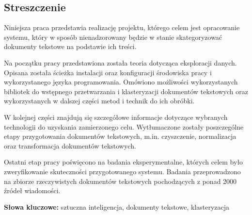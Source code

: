 \subsection*{Streszczenie}

Niniejsza praca przedstawia realizację projektu, którego celem jest opracowanie systemu, który w sposób nienadzorowany będzie w stanie skategoryzować dokumenty tekstowe na podstawie ich treści.

Na początku pracy przedstawiona została teoria dotycząca eksploracji danych. Opisana została ścieżka instalacji oraz konfiguracji środowiska pracy i wykorzystanego języka programowania. Omówiono możliwości wykorzystanych bibliotek do wstępnego przetwarzania i klasteryzacji dokumentów tekstowych oraz wykorzystanych w dalszej części metod i technik do ich obróbki. 

W kolejnej części znajdują się szczegółowe informacje dotyczące wybranych technologii do uzyskania zamierzonego celu. Wytłumaczone zostały poszczególne etapy przygotowania dokumentów tekstowych, m.in. czyszczenie, normalizacja oraz transformacja dokumentów tekstowych. 

Ostatni etap pracy poświęcono na badania eksperymentalne, których celem było zweryfikowanie skuteczności przygotowanego systemu. Badania przeprowadzono na zbiorze rzeczywistych dokumentów tekstowych pochodzących z ponad 2000 źródeł wiadomości.

\vspace{1cm}
\noindent\textbf{Słowa kluczowe:} sztuczna inteligencja, dokumenty tekstowe, klasteryzacja